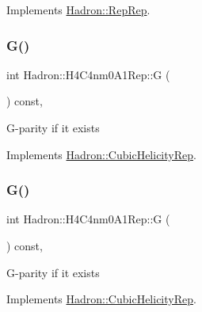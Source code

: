 Implements \mbox{\hyperlink{structHadron_1_1RepRep_a92c8802e5ed7afd7da43ccfd5b7cd92b}{Hadron\+::\+Rep\+Rep}}.

\mbox{\label{structHadron_1_1H4C4nm0A1Rep_a8982cc839b78b45f82c4361281a4c46a}} 
\subsubsection{\texorpdfstring{G()}{G()}\hspace{0.1cm}{\footnotesize\ttfamily [1/3]}}
{\footnotesize\ttfamily int Hadron\+::\+H4\+C4nm0\+A1\+Rep\+::G (\begin{DoxyParamCaption}{ }\end{DoxyParamCaption}) const\hspace{0.3cm}{\ttfamily [inline]}, {\ttfamily [virtual]}}

G-\/parity if it exists 

Implements \mbox{\hyperlink{structHadron_1_1CubicHelicityRep_a50689f42be1e6170aa8cf6ad0597018b}{Hadron\+::\+Cubic\+Helicity\+Rep}}.

\mbox{\label{structHadron_1_1H4C4nm0A1Rep_a8982cc839b78b45f82c4361281a4c46a}} 
\subsubsection{\texorpdfstring{G()}{G()}\hspace{0.1cm}{\footnotesize\ttfamily [2/3]}}
{\footnotesize\ttfamily int Hadron\+::\+H4\+C4nm0\+A1\+Rep\+::G (\begin{DoxyParamCaption}{ }\end{DoxyParamCaption}) const\hspace{0.3cm}{\ttfamily [inline]}, {\ttfamily [virtual]}}

G-\/parity if it exists 

Implements \mbox{\hyperlink{structHadron_1_1CubicHelicityRep_a50689f42be1e6170aa8cf6ad0597018b}{Hadron\+::\+Cubic\+Helicity\+Rep}}.

\mbox{\label{structHadron_1_1H4C4nm0A1Rep_a8982cc839b78b45f82c4361281a4c46a}} 
